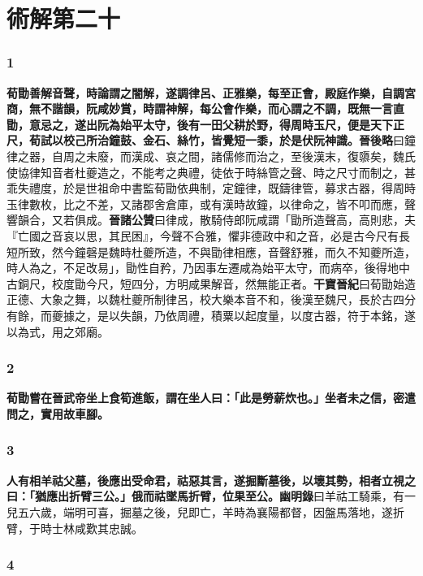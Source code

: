 \chapter{術解第二十}

\subsection*{1}

\textbf{荀勖善解音聲，時論謂之闇解，遂調律呂、正雅樂，每至正會，殿庭作樂，自調宮商，無不諧韻，阮咸妙賞，時謂神解，每公會作樂，而心謂之不調，既無一言直勖，意忌之，遂出阮為始平太守，後有一田父耕於野，得周時玉尺，便是天下正尺，荀試以校己所治鐘鼓、金石、絲竹，皆覺短一黍，於是伏阮神識。}{\footnotesize \textbf{晉後略}曰鐘律之器，自周之未廢，而漢成、哀之間，諸儒修而治之，至後漢末，復隳矣，魏氏使協律知音者杜夔造之，不能考之典禮，徒依于時絲管之聲、時之尺寸而制之，甚乖失禮度，於是世祖命中書監荀勖依典制，定鐘律，既鑄律管，募求古器，得周時玉律數枚，比之不差，又諸郡舍倉庫，或有漢時故鐘，以律命之，皆不叩而應，聲響韻合，又若俱成。\textbf{晉諸公贊}曰律成，散騎侍郎阮咸謂「勖所造聲高，高則悲，夫『亡國之音哀以思，其民困』，今聲不合雅，懼非德政中和之音，必是古今尺有長短所致，然今鐘磬是魏時杜夔所造，不與勖律相應，音聲舒雅，而久不知夔所造，時人為之，不足改易」，勖性自矜，乃因事左遷咸為始平太守，而病卒，後得地中古銅尺，校度勖今尺，短四分，方明咸果解音，然無能正者。\textbf{干寶晉紀}曰荀勖始造正德、大象之舞，以魏杜夔所制律呂，校大樂本音不和，後漢至魏尺，長於古四分有餘，而夔據之，是以失韻，乃依周禮，積粟以起度量，以度古器，符于本銘，遂以為式，用之郊廟。}

\subsection*{2}

\textbf{荀勖嘗在晉武帝坐上食筍進飯，謂在坐人曰：「此是勞薪炊也。」坐者未之信，密遣問之，實用故車腳。}

\subsection*{3}

\textbf{人有相羊祜父墓，後應出受命君，祜惡其言，遂掘斷墓後，以壞其勢，相者立視之曰：「猶應出折臂三公。」俄而祜墜馬折臂，位果至公。}{\footnotesize \textbf{幽明錄}曰羊祜工騎乘，有一兒五六歲，端明可喜，掘墓之後，兒即亡，羊時為襄陽都督，因盤馬落地，遂折臂，于時士林咸歎其忠誠。}

\subsection*{4}


